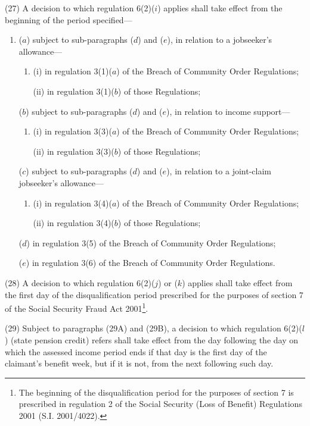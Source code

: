 \documentclass[12pt,a4paper]{article}
\begin{document}
(27) A decision to which regulation 6(2)($i$) applies shall take effect from the beginning of the period specified—
\begin{enumerate}\item[]
($a$) subject to sub-paragraphs ($d$)  and ($e$), in relation to a jobseeker’s allowance—
\begin{enumerate}\item[]
(i) in regulation 3(1)($a$)  of the Breach of Community Order Regulations;

(ii) in regulation 3(1)($b$)  of those Regulations;
\end{enumerate}

($b$) subject to sub-paragraphs ($d$)  and ($e$), in relation to income support—
\begin{enumerate}\item[]
(i) in regulation 3(3)($a$)  of the Breach of Community Order Regulations;

(ii) in regulation 3(3)($b$)  of those Regulations;
\end{enumerate}

($c$) subject to sub-paragraphs ($d$)  and ($e$), in relation to a joint-claim jobseeker’s allowance—
\begin{enumerate}\item[]
(i) in regulation 3(4)($a$)  of the Breach of Community Order Regulations;

(ii) in regulation 3(4)($b$)  of those Regulations;
\end{enumerate}

($d$) in regulation 3(5) of the Breach of Community Order Regulations;

($e$) in regulation 3(6) of the Breach of Community Order Regulations.
\end{enumerate}

(28) A decision to which regulation 6(2)($j$)  or ($k$)  applies shall take effect from the first day of the disqualification period prescribed for the purposes of section 7 of the Social Security Fraud Act 2001\footnote{The beginning of the disqualification period for the purposes of section 7 is prescribed in regulation 2 of the Social Security (Loss of Benefit) Regulations 2001 (S.I. 2001/4022).}.

(29) 
Subject to paragraphs (29A) and (29B), a  %
decision to which regulation 6(2)($l$) (state pension credit) refers shall take effect from the day following the day on which the assessed income period ends if that day is the first day of the claimant’s benefit week, but if it is not, from the next following such day.
\end{document}
